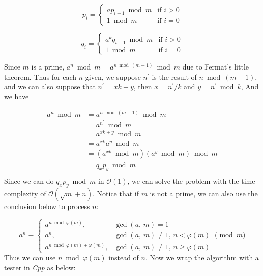 \documentclass[11pt, letterpaper]{article}
\begin{document}
\[
p_{i} =
\begin{cases}
    ap_{i-1} \bmod m & \text{if $i > 0$} \\
    1 \bmod m & \text{if $i = 0$}
\end{cases}
\]

\[
q_{i} =
\begin{cases}
    a^{k}q_{i-1} \bmod m & \text{if $i > 0$} \\
    1 \bmod m & \text{if $i = 0$}
\end{cases}
\]

Since $m$ is a prime, $a^{n}\bmod{m} = a^{n \bmod (m-1)}\bmod{m}$ due to Fermat's little theorem. Thus for each $n$ given, we suppose $n^{\prime}$ is the result of  $n \bmod (m-1)$, and we can also suppose that $n^{\prime}=xk+y$, then $x=n^{\prime} / k$ and $y=n^{\prime} \bmod k$, And we have


\begin{equation}\label{eq1}
\begin{split}
a^{n}\bmod{m}      & = a^{n \bmod (m-1)}\bmod{m} \\
                  & = a^{n^{\prime}}\bmod{m} \\
                  & = a^{xk+y}\bmod{m} \\
                  & = a^{xk}a^{y}\bmod{m} \\
                  & = (a^{xk} \bmod m)(a^{y} \bmod m) \bmod m \\
                  & = q_{x}p_{y}\bmod{m} \\
\end{split}
\end{equation}
Since we can do $q_{x}p_{y}\bmod{m}$ in $\mathcal{O}(1)$, we can solve the problem with the time complexity of $\mathcal{O}(\sqrt{m} + n)$.
Notice that if $m$ is not a prime, we can also use the conclusion below to process $n$:

\[
a^n\equiv
\begin{cases}
a^{n\bmod\varphi(m)},\,&\gcd(a,\,m)=1\\
a^n,&\gcd(a,\,m)\ne1,\,n<\varphi(m)\\
a^{n\bmod\varphi(m)+\varphi(m)},&\gcd(a,\,m)\ne1,\,n\ge\varphi(m)
\end{cases}
\pmod m
\]
Thus we can use $n \bmod \varphi(m)$ instead of $n$.
Now we wrap the algorithm with a tester in \emph{Cpp} as below:
\end{document}
